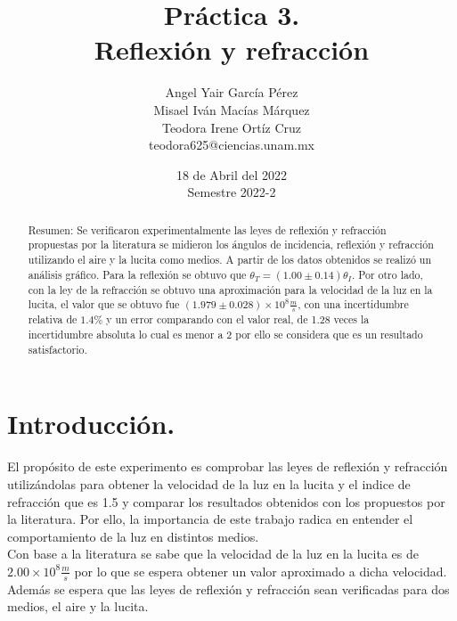 \documentclass[DIV=calc, paper=a4, fontsize=11pt]{scrartcl}
\title{Práctica 3. \\ %
Reflexión y refracción} %
\author{Angel Yair García Pérez \\
Misael Iván Macías Márquez\\
Teodora Irene Ortíz Cruz\\
\small{teodora625@ciencias.unam.mx}\\}
\date{18 de Abril del 2022\\Semestre 2022-2}
\begin{document}
\maketitle
{}
\begin{abstract}

  \textcolor{carmine}{Resumen: }Se verificaron experimentalmente las leyes de reflexión y refracción propuestas por la literatura se midieron los ángulos de incidencia, reflexión y refracción utilizando el aire y la lucita como medios. A partir de los datos obtenidos se realizó un análisis gráfico. Para la reflexión se obtuvo que $\theta_{T}=(1.00\pm0.14)\theta_{I}$. Por otro lado, con la ley de la refracción se obtuvo una aproximación para la velocidad de la luz en la lucita, el valor que se obtuvo fue $(1.979\pm 0.028)\times 10^{8}\frac{m}{s}$, con una incertidumbre relativa de $1.4\%$ y un error comparando con el valor real, de 1.28 veces la incertidumbre absoluta lo cual es menor a 2 por ello se considera que es un resultado satisfactorio.
\end{abstract}
\section*{\textcolor{carmine}{Introducción.}}
El propósito de este experimento es comprobar las leyes de reflexión y refracción \cite{Manual} utilizándolas para obtener la velocidad de la luz en la lucita y el indice de refracción  que es  1.5 \cite{hipotesis} y comparar los resultados obtenidos con los propuestos por la literatura. Por ello, la importancia de este trabajo radica en entender el comportamiento de la luz en distintos medios.\\
Con base a la literatura \cite{hipotesis} se sabe que la velocidad de la luz en la lucita es de $2.00\times10^{8}\frac{m}{s}$ por lo que se espera obtener un valor aproximado a dicha velocidad. Además se espera que las leyes de reflexión y refracción sean verificadas para dos medios, el aire  y la lucita.
\end{document}
